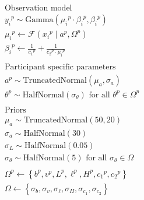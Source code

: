 \documentclass[a4paper,12pt]{article}
\begin{document}
\begin{align*}
    &\text{Observation model} \\
    &{y_i}^{p}\sim \text{Gamma}\left({\mu_i}^{p}\cdot{\beta_i}^{p}, {\beta_i}^{p}\right) \\
    &{\mu_i}^{p} \gets \mathcal{F}\left({x_i}^{p} \mid a^{p}, {\Omega}^{p}\right) \\
    &{\beta_i}^{p} \gets \frac1{{c_1}^{p}} + \frac1{{c_2}^{p}\cdot{\mu_i}^{p}}\\\\
    &\text{Participant specific parameters} \\
    &a^{p} \sim \text{TruncatedNormal}\left({\mu_a}, {\sigma_a}\right)\\
    &{\theta}^{p} \sim \text{HalfNormal}\left({\sigma_{\theta}}\right) \text{ for all } \theta^{p} \in {\Omega}^{p}\\\\
    &\text{Priors} \\
    & {\mu_a} \sim \text{TruncatedNormal}\left(50, 20\right)\\
    &{\sigma_a} \sim \text{HalfNormal}\left(30\right)\\
    &{\sigma_L} \sim \text{HalfNormal}\left(0.05\right)\\
    &{\sigma_\theta} \sim \text{HalfNormal}\left(5\right) \text{ for all } {\sigma_\theta}\in \Omega\\\\
    &{\Omega}^{p} \gets \left\{{b}^{p}, {v}^{p}, {L}^{p}, {\ell}^{p}, {H}^{p}, {c_1}^{p}, {c_2}^{p}\right\}\\
    &\Omega \gets \left\{{\sigma_{b}}, {\sigma_{v}},  {\sigma_{\ell}}, {\sigma_{H}}, {\sigma_{c_1}}, {\sigma_{c_2}}\right\}
\end{align*}
\end{document}
